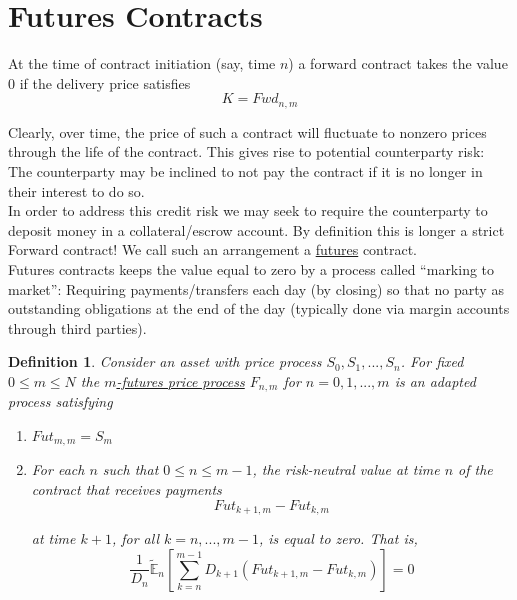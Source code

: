 \documentclass[12pt]{article}
\newtheorem{definition}{Definition}
\newlength\tindent
\renewcommand{\indent}{\hspace*{\tindent}}
\newcommand{\E}{\mathbb E}
\begin{document}
\section{Futures Contracts}

\indent At the time of contract initiation (say, time $n$) a forward contract takes the value 0 if the delivery price satisfies
\begin{equation*}
	K = Fwd_{n,m}
\end{equation*}

\indent Clearly, over time, the price of such a contract will fluctuate to nonzero prices through the life of the contract. This gives rise to potential counterparty risk: The counterparty may be inclined to not pay the contract if it is no longer in their interest to do so. \\

\indent In order to address this credit risk we may seek to require the counterparty to deposit money in a collateral/escrow account. By definition this is longer a strict Forward contract! We call such an arrangement a \underline{futures} contract. \\

\indent Futures contracts keeps the value equal to zero by a process called ``marking to market'': Requiring payments/transfers each day (by closing) so that no party as outstanding obligations at the end of the day (typically done via margin accounts through third parties). \\

\begin{definition} Consider an asset with price process $S_0, S_1,...,S_n$. For fixed $0 \leq m \leq N$ the \underline{$m$-futures price process} $F_{n,m}$ for $n = 0,1,...,m$ is an adapted process satisfying
\begin{enumerate}
	\item $Fut_{m,m} = S_m$
	\item For each $n$ such that $0 \leq n \leq m - 1$, the risk-neutral value at time $n$ of the contract that receives payments 
	\begin{equation*}
		Fut_{k + 1,m} - Fut_{k,m}
	\end{equation*}
	
	at time $k + 1$, for all $k = n,...,m - 1$, is equal to zero. That is,
	\begin{equation*}
		\frac{1}{D_n} \tilde{\E}_n \left[ \sum^{m - 1}_{k = n} D_{k + 1} \left( Fut_{k + 1,m} - Fut_{k,m} \right) \right] = 0
	\end{equation*}
\end{enumerate}
\end{definition}
\end{document}
